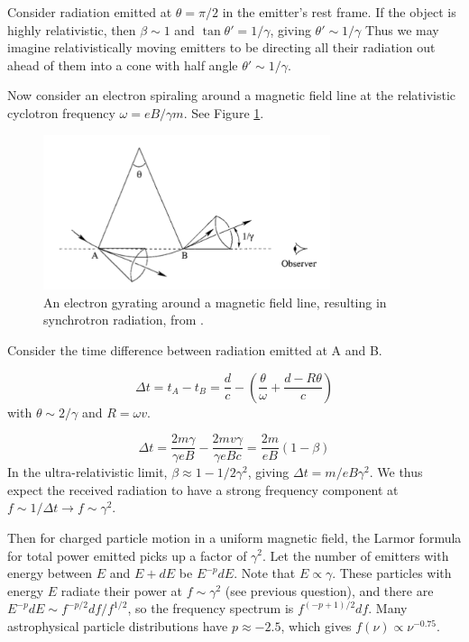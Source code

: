 Consider radiation emitted at $\theta=\pi/2$ in the emitter's rest frame. If the object is highly relativistic, then $\beta\sim1$ and $\tan\theta'=1/\gamma$, giving $\theta'\sim1/\gamma$ Thus we may imagine relativistically moving emitters to be directing all their radiation out ahead of them into a cone with half angle $\theta'\sim1/\gamma$. 

Now consider an electron spiraling around a magnetic field line at the relativistic cyclotron frequency $\omega=eB/\gamma m$. See Figure \ref{fig:synchrotrondiagram}. 

\begin{figure}[h]
    \centering
    \includegraphics[width=0.75\textwidth]{chap0_intro/synchrotrondiagram.png}
    \caption[Diagram of electron gyration around a magnetic field line, resulting in synchrotron radiation.]{An electron gyrating around a magnetic field line, resulting in synchrotron radiation, from \citet{choudhuri2010astrophysics}.}
    \label{fig:synchrotrondiagram}
\end{figure}

Consider the time difference between radiation emitted at A and B. 

\begin{equation}
\Delta t=t_A-t_B=\frac{d}{c}-\left(\frac{\theta}{\omega}+\frac{d-R\theta}{c}\right)
\end{equation}
with $\theta\sim2/\gamma$ and $R=\omega v$. 

\begin{equation}
\Delta t = \frac{2m\gamma}{\gamma e B}-\frac{2mv\gamma}{\gamma eB c}=\frac{2m}{eB}(1-\beta)
\end{equation}
In the ultra-relativistic limit, $\beta\approx1-1/2\gamma^2$, giving $\Delta t=m/eB\gamma^2$. We thus expect the received radiation to have a strong frequency component at $f\sim1/\Delta t\to f\sim\gamma^2$. 

Then for charged particle motion in a uniform magnetic field, the Larmor formula for total power emitted picks up a factor of $\gamma^2$. Let the number of emitters with energy between $E$ and $E+dE$ be $E^{-p}dE$. Note that $E\propto\gamma$. These particles with energy $E$ radiate their power at $f\sim\gamma^2$ (see previous question), and there are $E^{-p}dE\sim f^{-p/2}df/f^{1/2}$, so the frequency spectrum is $f^{(-p+1)/2}df$. Many astrophysical particle distributions have $p\approx-2.5$, which gives $f(\nu)\propto\nu^{-0.75}$.
